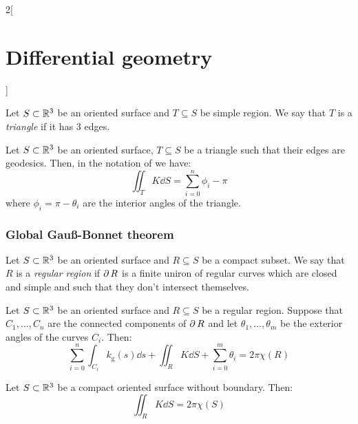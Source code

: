 \documentclass[../../../main_math.tex]{subfiles}
\begin{document}
\begin{multicols}{2}[\section{Differential geometry}]
\begin{theorem}
  \end{theorem}
  \begin{definition}
    Let $S\subset\mathbb{R}^3$ be an oriented surface and $T\subseteq S$ be simple region. We say that $T$ is a \emph{triangle} if it has 3 edges.
  \end{definition}
  \begin{corollary}
    Let $S\subset\mathbb{R}^3$ be an oriented surface, $T\subseteq S$ be a triangle such that their edges are geodesics. Then, in the notation of  we have: $$\iint_{T}K\dd{S}=\sum_{i=0}^n\phi_i-\pi$$
    where $\phi_i=\pi-\theta_i$ are the interior angles of the triangle.
  \end{corollary}
  \subsubsection{Global Gau\ss-Bonnet theorem}
  \begin{definition}
    Let $S\subset\mathbb{R}^3$ be an oriented surface and $R\subseteq S$ be a compact subset. We say that $R$ is a \emph{regular region} if $\operatorname{\partial}{R}$ is a finite uniron of regular curves which are closed and simple and such that they don't intersect themselves.
  \end{definition}
  \begin{theorem}
    Let $S\subset\mathbb{R}^3$ be an oriented surface and $R\subseteq S$ be a regular region. Suppose that $C_1,\ldots,C_n$ are the connected components of $\operatorname{\partial}{R}$ and let $\theta_1,\ldots,\theta_m$ be the exterior angles of the curves $C_i$. Then: $$\sum_{i=0}^n\int_{C_i}k_{\text{g}}(s)\dd{s}+\iint_{R}K\dd{S}+\sum_{i=0}^m\theta_i=2\pi\chi(R)$$
  \end{theorem}
  \begin{corollary}
    Let $S\subset\mathbb{R}^3$ be a compact oriented surface without boundary. Then: $$\iint_{R}K\dd{S}=2\pi\chi(S)$$
  \end{corollary}

\end{multicols}
\end{document}
